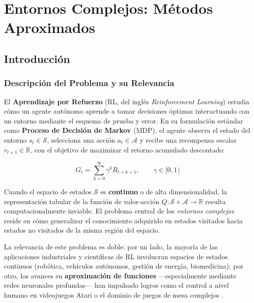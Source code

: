 
\chapter{Entornos Complejos: Métodos Aproximados}

\section{Introducción}

\subsection{Descripción del Problema y su Relevancia}

El \textbf{Aprendizaje por Refuerzo} (RL, del inglés \textit{Reinforcement Learning}) estudia cómo un agente autónomo aprende a tomar decisiones óptimas interactuando con un entorno mediante el esquema de prueba y error. En su formulación estándar como \textbf{Proceso de Decisión de Markov} (MDP), el agente observa el estado del entorno $s_t \in \mathcal{S}$, selecciona una acción $a_t \in \mathcal{A}$ y recibe una recompensa escalar $r_{t+1} \in \mathbb{R}$, con el objetivo de maximizar el retorno acumulado descontado:

\begin{equation}
  G_t = \sum_{k=0}^{\infty} \gamma^k R_{t+k+1}, \qquad \gamma \in [0, 1)
\end{equation}

Cuando el espacio de estados $\mathcal{S}$ es \textbf{continuo} o de alta dimensionalidad, la representación tabular de la función de valor-acción $Q: \mathcal{S} \times \mathcal{A} \to \mathbb{R}$ resulta computacionalmente inviable. El problema central de los \textit{entornos complejos} reside en cómo generalizar el conocimiento adquirido en estados visitados hacia estados no visitados de la misma región del espacio.

La relevancia de este problema es doble: por un lado, la mayoría de las aplicaciones industriales y científicas de RL involucran espacios de estados continuos (robótica, vehículos autónomos, gestión de energía, biomedicina); por otro, los avances en \textbf{aproximación de funciones} —especialmente mediante redes neuronales profundas— han impulsado logros como el control a nivel humano en videojuegos Atari \cite{Mnih2015} o el dominio de juegos de mesa complejos \cite{Silver2017}.

